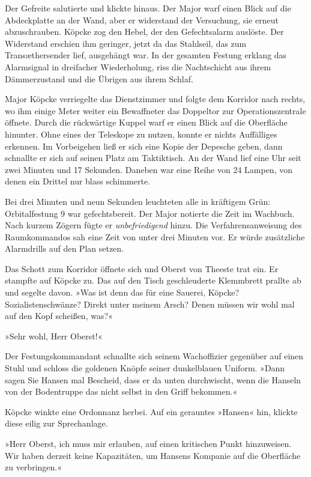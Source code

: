 Der Gefreite salutierte und klickte hinaus. Der Major warf einen
Blick auf die Abdeckplatte an der Wand, aber er widerstand der
Versuchung, sie erneut abzuschrauben. Köpcke zog den Hebel, der den
Gefechtsalarm auslöste. Der Widerstand erschien ihm geringer, jetzt
da das Stahlseil, das zum Transæthersender lief, ausgehängt war. In
der gesamten Festung erklang das Alarmsignal in dreifacher
Wiederholung, riss die Nachtschicht aus ihrem Dämmerzustand und die
Übrigen aus ihrem Schlaf.

Major Köpcke verriegelte das Dienstzimmer und folgte dem Korridor
nach rechts, wo ihm einige Meter weiter ein Bewaffneter das
Doppeltor zur Operationszentrale öffnete. Durch die rückwärtige
Kuppel warf er einen Blick auf die Oberfläche hinunter. Ohne eines
der Teleskope zu nutzen, konnte er nichts Auffälliges erkennen. Im
Vorbeigehen ließ er sich eine Kopie der Depesche geben, dann
schnallte er sich auf seinen Platz am Taktiktisch. An der Wand lief
eine Uhr seit zwei Minuten und 17 Sekunden. Daneben war eine Reihe
von 24 Lampen, von denen ein Drittel nur blass schimmerte.

Bei drei Minuten und neun Sekunden leuchteten alle in kräftigem
Grün: Orbitalfestung 9 war gefechtsbereit. Der Major notierte die
Zeit im Wachbuch. Nach kurzem Zögern fügte er \emph{unbefriedigend}
hinzu. Die Verfahrensanweisung des Raumkommandos sah eine Zeit von
unter drei Minuten vor. Er würde zusätzliche Alarmdrills auf den
Plan setzen.

Das Schott zum Korridor öffnete sich und Oberst von Theeste trat
ein. Er stampfte auf Köpcke zu. Das auf den Tisch geschleuderte
Klemmbrett prallte ab und segelte davon. »Was ist denn das für eine
Sauerei, Köpcke? Sozialistenschwänze? Direkt unter meinem Arsch?
Denen müssen wir wohl mal auf den Kopf scheißen, was?«

»Sehr wohl, Herr Oberst!«

Der Festungskommandant schnallte sich seinem Wachoffizier gegenüber
auf einen Stuhl und schloss die goldenen Knöpfe seiner dunkelblauen
Uniform. »Dann sagen Sie Hansen mal Bescheid, dass er da unten
durchwischt, wenn die Hanseln von der Bodentruppe das nicht selbst
in den Griff bekommen.«

Köpcke winkte eine Ordonnanz herbei. Auf ein gerauntes »Hansen«
hin, klickte diese eilig zur Sprechanlage.

»Herr Oberst, ich muss mir erlauben, auf einen kritischen Punkt
hinzuweisen. Wir haben derzeit keine Kapazitäten, um Hansens
Kompanie auf die Oberfläche zu verbringen.«

